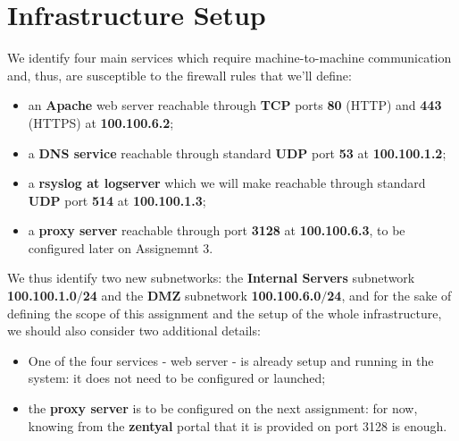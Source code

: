\section{Infrastructure Setup}
We identify four main services which require machine-to-machine communication and, thus, are susceptible to the firewall rules that we'll define:\\
\begin{itemize}
\item an \textbf{Apache} web server reachable through \textbf{TCP} ports \textbf{80} (HTTP) and \textbf{443} (HTTPS) at \textbf{100.100.6.2};
\item a \textbf{DNS service} reachable through standard \textbf{UDP} port \textbf{53} at \textbf{100.100.1.2};
\item a \textbf{rsyslog at logserver} which we will make reachable through standard \textbf{UDP} port \textbf{514} at \textbf{100.100.1.3};
\item a \textbf{proxy server} reachable through port \textbf{3128} at \textbf{100.100.6.3}, to be configured later on Assignemnt 3.
\end{itemize}

We thus identify two new subnetworks: the \textbf{Internal Servers} subnetwork \textbf{100.100.1.0$/$24} and the \textbf{DMZ} subnetwork \textbf{100.100.6.0$/$24}, and for the sake of defining the scope of this assignment and the setup of the whole infrastructure, we should also consider two additional details:\\
\begin{itemize}
\item One of the four services - web server - is already setup and running in the system: it does not need to be configured or launched;
\item the \textbf{proxy server} is to be configured on the next assignment: for now, knowing from the \textbf{zentyal} portal that it is provided on port 3128 is enough.
\end{itemize}

